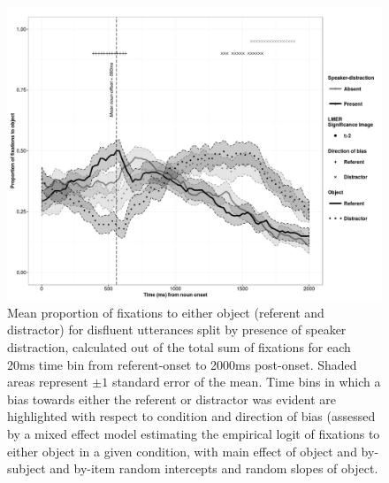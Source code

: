 \documentclass[man]{apa6}
\begin{document}
\begin{figure}
  \centering
	\includegraphics[scale=.5]{disfluent.png}
  \caption{Mean proportion of fixations to either object (referent and distractor) for disfluent utterances split by presence of speaker distraction, calculated out of the total sum of fixations for each 20ms time bin from referent-onset to 2000ms post-onset. Shaded areas represent $\pm 1$ standard error of the mean. Time bins in which a bias towards either the referent or distractor was evident are highlighted with respect to condition and direction of bias (assessed by a mixed effect model estimating the empirical logit of fixations to either object in a given condition, with main effect of object and by-subject and by-item random intercepts and random slopes of object.}
  \label{fig:diseye}
\end{figure}
\end{document}
